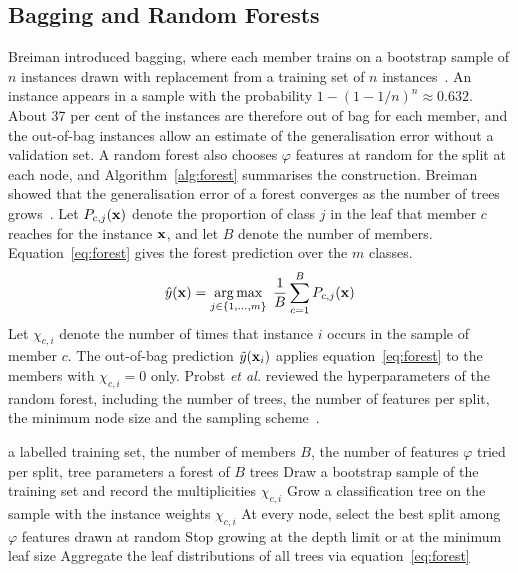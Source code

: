 \documentclass[10pt,conference]{IEEEtran}
\begin{document}
\subsection{Bagging and Random Forests}
\label{sec:bg-forest}

Breiman introduced bagging, where each member trains on a bootstrap sample of $n$ instances drawn with replacement from a training set of $n$ instances~\cite{breiman1996}. An instance appears in a sample with the probability $1 - (1 - 1/n)^{n} \approx 0.632$. About 37 per cent of the instances are therefore out of bag for each member, and the out-of-bag instances allow an estimate of the generalisation error without a validation set. A random forest also chooses $\varphi$ features at random for the split at each node, and Algorithm~\ref{alg:forest} summarises the construction. Breiman showed that the generalisation error of a forest converges as the number of trees grows~\cite{breiman2001}. Let $P_{c,j}(\mathbf{x})$ denote the proportion of class $j$ in the leaf that member $c$ reaches for the instance $\mathbf{x}$, and let $B$ denote the number of members. Equation~\eqref{eq:forest} gives the forest prediction over the $m$ classes.
\begin{equation}
\label{eq:forest}
\hat{y}(\mathbf{x}) = \operatorname*{arg\,max}_{j \in \{1, \ldots, m\}} \; \frac{1}{B} \sum_{c=1}^{B} P_{c,j}(\mathbf{x})
\end{equation}
Let $\chi_{c,i}$ denote the number of times that instance $i$ occurs in the sample of member $c$. The out-of-bag prediction $\tilde{y}(\mathbf{x}_i)$ applies equation~\eqref{eq:forest} to the members with $\chi_{c,i} = 0$ only. Probst \textit{et al.} reviewed the hyperparameters of the random forest, including the number of trees, the number of features per split, the minimum node size and the sampling scheme~\cite{probst2019}.

\begin{algorithm}[t]
\caption{Construction of a random forest}
\label{alg:forest}
\begin{algorithmic}[1]
\Require a labelled training set, the number of members $B$, the number of features $\varphi$ tried per split, tree parameters
\Ensure a forest of $B$ trees
    \State Draw a bootstrap sample of the training set and record the multiplicities $\chi_{c,i}$
    \State Grow a classification tree on the sample with the instance weights $\chi_{c,i}$
    \State At every node, select the best split among $\varphi$ features drawn at random
    \State Stop growing at the depth limit or at the minimum leaf size
\EndFor
\State Aggregate the leaf distributions of all trees via equation~\eqref{eq:forest}
\end{algorithmic}
\end{algorithm}
\end{document}
